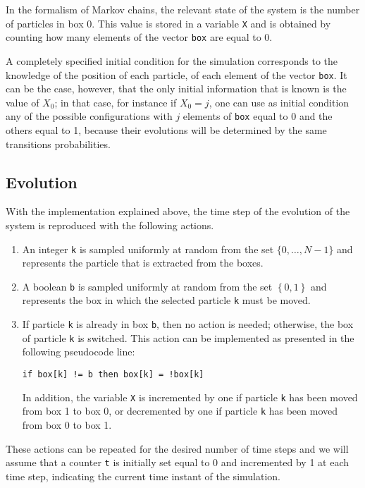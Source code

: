 In the formalism of Markov chains, the relevant state of the system is the number of particles in box 0. This value is stored in a variable \texttt{X} and is obtained by counting how many elements of the vector \texttt{box} are equal to 0. 

A completely specified initial condition for the simulation corresponds to the knowledge of the position of each particle, \ie of each element of the vector \texttt{box}. It can be the case, however, that the only initial information that is known is the value of $X_0$; in that case, for instance if $X_0 = j$, one can use as initial condition any of the possible configurations with $j$ elements of \texttt{box} equal to 0 and the others equal to 1, because their evolutions will be determined by the same transitions probabilities.

\subsection{Evolution}
With the implementation explained above, the time step of the evolution of the system is reproduced with the following actions. 

\begin{enumerate}
    \item An integer \texttt{k} is sampled uniformly at random from the set $\{0,\dots, N-1\}$ and represents the particle that is extracted from the boxes.
    \item A boolean \texttt{b} is sampled uniformly at random from the set $\left\{0,1\right\}$ and represents the box in which the selected particle \texttt{k} must be moved.
    \item If particle \texttt{k} is already in box \texttt{b}, then no action is needed; otherwise, the box of particle \texttt{k} is switched. This action can be implemented as presented in the following pseudocode line:
    \begin{center}
        \texttt{if box[k] != b then box[k] = !box[k]}
    \end{center}
    In addition, the variable \texttt{X} is incremented by one if particle \texttt{k} has been moved from box 1 to box 0, or decremented by one if particle \texttt{k} has been moved from box 0 to box 1.
\end{enumerate}
These actions can be repeated for the desired number of time steps and we will assume that a counter \texttt{t} is initially set equal to 0 and incremented by 1 at each time step, indicating the current time instant of the simulation.

